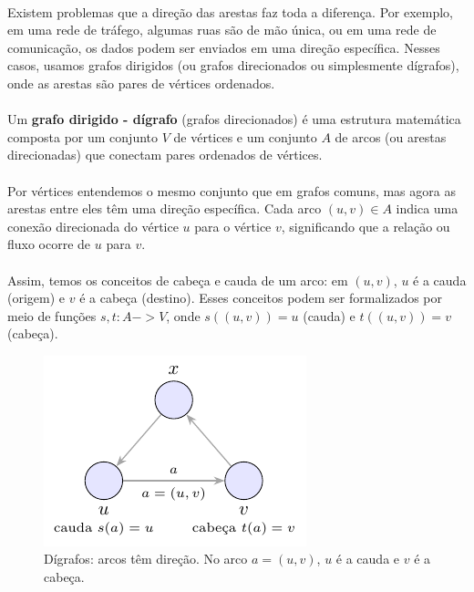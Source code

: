 \documentclass[12pt,a4paper]{article}
\def\emph#1{#1}%
\def\to{->}%
\begin{document}
\paragraph{}
Existem problemas que a direção das arestas faz toda a diferença. Por exemplo, em uma rede de tráfego, algumas ruas são de mão única, ou em uma rede de comunicação, os dados podem ser enviados em uma direção específica. Nesses casos, usamos \emph{grafos dirigidos} (ou grafos direcionados ou simplesmente dígrafos), onde as arestas são pares de vértices ordenados.

\paragraph{}
Um \textbf{grafo dirigido - dígrafo} (grafos direcionados) é uma estrutura matemática composta por um conjunto \(V\) de \emph{vértices} e um conjunto \(A\) de \emph{arcos} (ou \emph{arestas direcionadas}) que conectam pares ordenados de vértices.

\paragraph{}
Por vértices entendemos o mesmo conjunto que em grafos comuns, mas agora as arestas entre eles têm uma direção específica. Cada arco \((u, v) \in A\) indica uma conexão direcionada do vértice \(u\) para o vértice \(v\), significando que a relação ou fluxo ocorre de \(u\) para \(v\).

\paragraph{}
Assim, temos os conceitos de cabeça e cauda de um arco: em \((u, v)\), \(u\) é a \emph{cauda} (origem) e \(v\) é a \emph{cabeça} (destino). Esses conceitos podem ser formalizados por meio de funções \(s, t: A \to V\), onde \(s((u, v)) = u\) (cauda) e \(t((u, v)) = v\) (cabeça).


\begin{figure}[H]
    \centering
    \includegraphics[width=0.9\linewidth]{figures/fig_def_digrafo.pdf}

    \caption{Dígrafos: arcos têm direção. No arco $a=(u,v)$, $u$ é a \emph{cauda} e $v$ é a \emph{cabeça}.}
    \label{fig:def-digrafo}
\end{figure}
\end{document}
